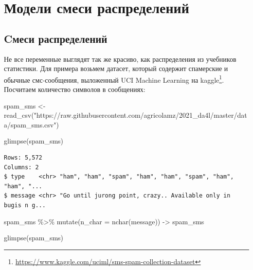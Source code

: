 \documentclass[
]{book}
\newenvironment{Shaded}{\begin{snugshade}}{\end{snugshade}}
\newcommand{\AttributeTok}[1]{\textcolor[rgb]{0.77,0.63,0.00}{#1}}
\newcommand{\FunctionTok}[1]{\textcolor[rgb]{0.00,0.00,0.00}{#1}}
\newcommand{\NormalTok}[1]{#1}
\newcommand{\OtherTok}[1]{\textcolor[rgb]{0.56,0.35,0.01}{#1}}
\newcommand{\SpecialCharTok}[1]{\textcolor[rgb]{0.00,0.00,0.00}{#1}}
\newcommand{\StringTok}[1]{\textcolor[rgb]{0.31,0.60,0.02}{#1}}
\renewcommand{\href}[2]{#2\footnote{\url{#1}}}
\begin{document}
\hypertarget{ux43cux43eux434ux435ux43bux438-ux441ux43cux435ux441ux438-ux440ux430ux441ux43fux440ux435ux434ux435ux43bux435ux43dux438ux439}{%
\chapter{Модели смеси распределений}\label{ux43cux43eux434ux435ux43bux438-ux441ux43cux435ux441ux438-ux440ux430ux441ux43fux440ux435ux434ux435ux43bux435ux43dux438ux439}}

\hypertarget{cux43cux435ux441ux438-ux440ux430ux441ux43fux440ux435ux434ux435ux43bux435ux43dux438ux439}{%
\section{Cмеси распределений}\label{cux43cux435ux441ux438-ux440ux430ux441ux43fux440ux435ux434ux435ux43bux435ux43dux438ux439}}

Не все переменные выглядят так же красиво, как распределения из учебников статистики. Для примера возьмем датасет, который содержит спамерские и обычные смс-сообщения, выложенный UCI Machine Learning \href{https://www.kaggle.com/uciml/sms-spam-collection-dataset}{на kaggle}. Посчитаем количество символов в сообщениях:

\begin{Shaded}
\begin{Highlighting}[]
\NormalTok{spam\_sms }\OtherTok{\textless{}{-}} \FunctionTok{read\_csv}\NormalTok{(}\StringTok{"https://raw.githubusercontent.com/agricolamz/2021\_da4l/master/data/spam\_sms.csv"}\NormalTok{)}

\FunctionTok{glimpse}\NormalTok{(spam\_sms)}
\end{Highlighting}
\end{Shaded}

\begin{verbatim}
Rows: 5,572
Columns: 2
$ type    <chr> "ham", "ham", "spam", "ham", "ham", "spam", "ham", "ham", "...
$ message <chr> "Go until jurong point, crazy.. Available only in bugis n g...
\end{verbatim}

\begin{Shaded}
\begin{Highlighting}[]
\NormalTok{spam\_sms }\SpecialCharTok{\%\textgreater{}\%} 
  \FunctionTok{mutate}\NormalTok{(}\AttributeTok{n\_char =} \FunctionTok{nchar}\NormalTok{(message)) }\OtherTok{{-}\textgreater{}}
\NormalTok{  spam\_sms}
  
\FunctionTok{glimpse}\NormalTok{(spam\_sms)}
\end{Highlighting}
\end{Shaded}
\end{document}
